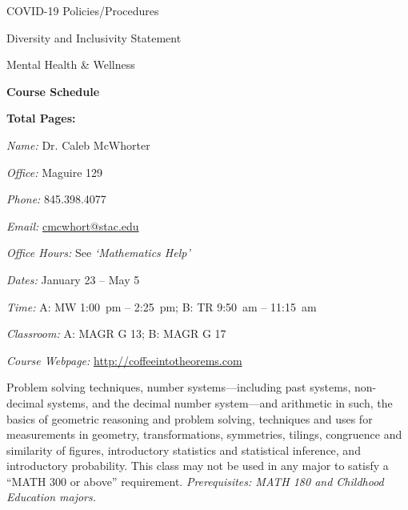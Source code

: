 \documentclass[11pt,letterpaper]{article}
\makeatletter
\newcommand{\classdates}{January 23 -- May 5}
\newcommand{\classtimes}{A: MW 1:00~pm -- 2:25~pm; B: TR 9:50~am -- 11:15~am}
\newcommand{\classroom}{A: MAGR G 13; B: MAGR G 17}
\newcommand{\instructor}{Dr. Caleb McWhorter}
\newcommand{\office}{Maguire 129}
\newcommand{\phone}{845.398.4077}
\newcommand{\email}{cmcwhort@stac.edu}
\newcommand{\website}{http://coffeeintotheorems.com}
\newcommand{\officehours}{See \textit{`Mathematics Help'}}
\makeatother
\begin{document}
\begin{minipage}[t]{0.45\textwidth}
\hspace{0.3cm} COVID-19 Policies/Procedures \dotfill \pageref{college_healthsafety} \par
\hspace{0.3cm} Diversity and Inclusivity Statement \dotfill \pageref{college_inclusive} \par
\hspace{0.3cm} Mental Health \& Wellness \dotfill \pageref{mental_wellness} \par
{\bfseries\color{stacred} Course Schedule} \dotfill \pageref{schd} \par
\hfill {\bfseries\color{stacred} Total Pages:} \pageref*{LastPage}
\end{minipage}
\sectionbreak









\textit{Name:} \instructor \par
\textit{Office:} \office \par
\textit{Phone:} \phone \par
\textit{Email:} \href{mailto:\email}{\email} \par
\textit{Office Hours:} \officehours 
\sectionbreak



\textit{Dates:} \classdates \par
\textit{Time:} \classtimes \par
\textit{Classroom:} \classroom \par
\textit{Course Webpage:} \href{\website}{\website}
\sectionbreak



Problem solving techniques, number systems---including past systems, non-decimal systems, and the decimal number system—and arithmetic in such, the basics of geometric reasoning and problem solving, techniques and uses for measurements in geometry, transformations, symmetries, tilings, congruence and similarity of figures, introductory statistics and statistical inference, and introductory probability. This class may not be used in any major to satisfy a ``MATH 300 or above'' requirement. {\itshape Prerequisites: MATH 180 and Childhood Education majors.}
\sectionbreak
\end{document}
